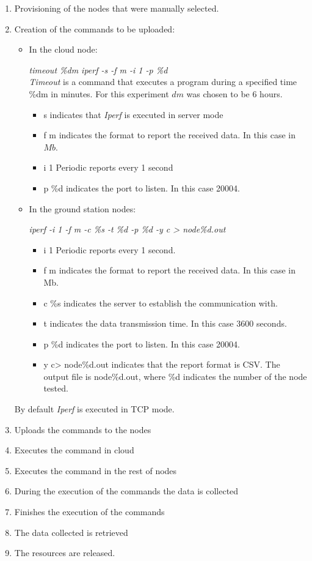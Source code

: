 \begin{enumerate}
\item Provisioning of the nodes that were manually selected.
\item Creation of the commands to be uploaded:
\begin{itemize}
\item In the cloud node:

\emph{timeout \%dm iperf -s -f m -i 1 -p \%d} \\
\emph{Timeout} is a command that executes a program during a specified time \%dm in
minutes. For this experiment $dm$ was chosen to be 6 hours.
\begin{itemize}
\item s indicates that \emph{Iperf} is executed in server mode
\item f m indicates the format to report the received data. In this case in $Mb$.
\item i 1 Periodic reports every 1 second
\item p \%d indicates the port to listen. In this case 20004.
\end{itemize}

\item In the ground station nodes:

\emph{iperf  -i 1 -f m -c \%s -t \%d -p \%d  -y c > node\%d.out}\\
\begin{itemize}
\item i 1 Periodic reports every 1 second.
\item f m indicates the format to report the received data. In this case in Mb.
\item c \%s indicates the server to establish the communication with.
\item t indicates the data transmission time. In this case 3600 seconds.
\item p \%d indicates the port to listen. In this case 20004.
\item y c> node\%d.out indicates that the report format is \ac{CSV}. The output file
  is node\%d.out, where \%d indicates the number of the node tested.
\end{itemize}
\end{itemize}

By default \emph{Iperf} is executed in \ac{TCP} mode.

\item Uploads the commands to the nodes
\item Executes the command in cloud
\item Executes the command in the rest of nodes
\item During the execution of the commands the data is collected
\item Finishes the execution of the commands
\item The data collected is retrieved
\item The resources are released.
\end{enumerate}

